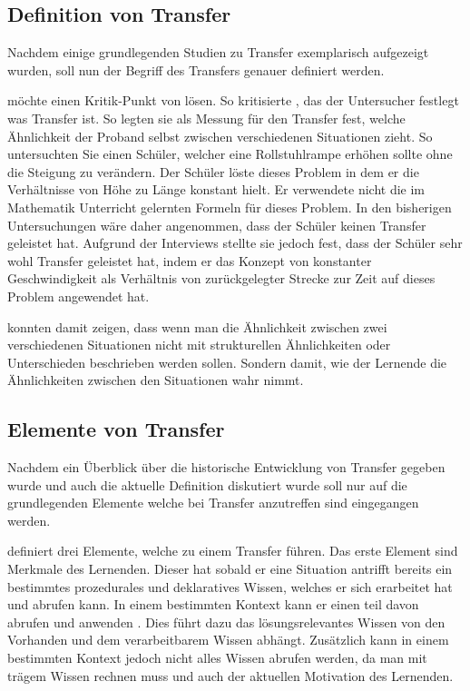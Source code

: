 \subsection{Definition von Transfer}

Nachdem einige grundlegenden Studien zu Transfer exemplarisch aufgezeigt wurden, soll nun der Begriff des Transfers genauer definiert werden. 


\citet{Lobato2002a} möchte einen Kritik-Punkt von \citet{Lave1988} lösen. So kritisierte \citeauthor{Lave1988}, das der Untersucher festlegt was Transfer ist. So legten sie als Messung für den Transfer fest, welche Ähnlichkeit der Proband selbst zwischen verschiedenen Situationen zieht. So untersuchten Sie einen Schüler, welcher eine Rollstuhlrampe erhöhen sollte ohne die Steigung zu verändern. Der Schüler löste dieses Problem in dem er die Verhältnisse von Höhe zu Länge konstant hielt. Er verwendete nicht die im Mathematik Unterricht gelernten Formeln für dieses Problem. In den bisherigen Untersuchungen wäre daher angenommen, dass der Schüler keinen Transfer geleistet hat. Aufgrund der Interviews stellte sie jedoch fest, dass der Schüler sehr wohl Transfer geleistet hat, indem er das Konzept von konstanter Geschwindigkeit als Verhältnis von zurückgelegter Strecke zur Zeit auf dieses Problem angewendet hat.

\citet{Lobato2002a} konnten damit zeigen, dass wenn man die Ähnlichkeit zwischen zwei verschiedenen Situationen nicht mit strukturellen Ähnlichkeiten oder Unterschieden beschrieben werden sollen. Sondern damit, wie der Lernende die Ähnlichkeiten zwischen den Situationen wahr nimmt.

\subsection{Elemente von Transfer}

Nachdem ein Überblick über die historische Entwicklung von Transfer gegeben wurde und auch die aktuelle Definition diskutiert wurde soll nur auf die grundlegenden Elemente welche bei Transfer anzutreffen sind eingegangen werden.

\citet{Marini1995} definiert drei Elemente, welche zu einem Transfer führen. Das erste Element sind Merkmale des Lernenden. Dieser hat sobald er eine Situation antrifft bereits ein bestimmtes prozedurales und deklaratives Wissen, welches er sich erarbeitet hat und abrufen kann. In einem bestimmten Kontext kann er einen teil davon abrufen und anwenden \citep[s. S. 189ff]{Marini1995}. Dies führt dazu das lösungsrelevantes Wissen von den Vorhanden und dem verarbeitbarem Wissen abhängt. Zusätzlich kann in einem bestimmten Kontext jedoch nicht alles Wissen abrufen werden, da man mit trägem Wissen rechnen muss und auch der aktuellen Motivation des Lernenden. 

